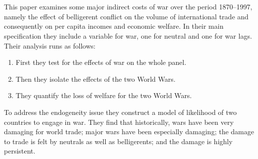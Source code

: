 \documentclass[12pt,a4paper,titlepage,english]{article}
\begin{document}
\section*{\cite{glick2010collateral}}
This paper examines some major indirect costs of war over the period 1870–1997, namely the effect of belligerent conflict on the volume of international trade and consequently on per capita incomes and economic welfare. In their main specification they include a variable for war, one for neutral and one for war lags. Their analysis runs as follows: 
\begin{enumerate}
\item{First they test for the effects of war on the whole panel.}
\item{Then they isolate the effects of the two World Wars. }
\item{They quantify the loss of welfare for the two World Wars.}
\end{enumerate}
To address the endogeneity issue they construct a model of likelihood of two countries to engage in war. They find that historically, wars have been very damaging for world trade; major wars have been especially damaging; the damage to trade is felt by neutrals as well as belligerents; and the damage is highly persistent. 
\end{document}
